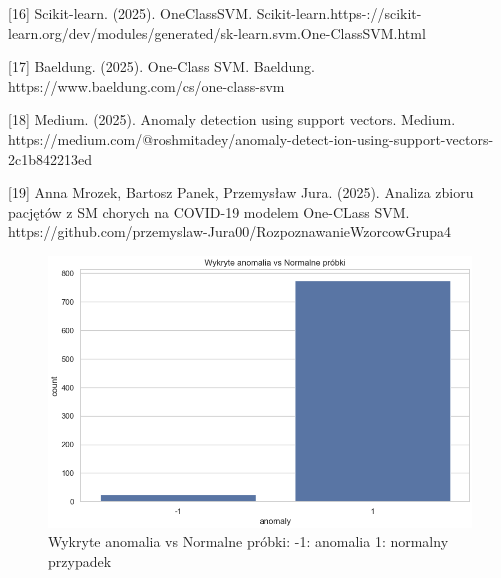 \documentclass[a4paper,fleqn]{cas-dc}
\begin{document}
[16] Scikit-learn. (2025). OneClassSVM. Scikit-learn.https-://scikit-learn.org/dev/modules/generated/sk-learn.svm.One-ClassSVM.html

[17] Baeldung. (2025). One-Class SVM. Baeldung. https://www.baeldung.com/cs/one-class-svm

[18] Medium. (2025). Anomaly detection using support vectors. Medium. https://medium.com/@roshmitadey/anomaly-detect-ion-using-support-vectors-2c1b842213ed

[19] Anna Mrozek, Bartosz Panek, Przemysław Jura. (2025). Analiza zbioru pacjętów z SM chorych na COVID-19 modelem One-CLass SVM. https://github.com/przemyslaw-Jura00/RozpoznawanieWzorcowGrupa4


\newpage
\begin{figure}[ht]
	\includegraphics[scale=.50]{wykresy/wykres1.png}
	\caption{Wykryte anomalia vs Normalne próbki: -1: anomalia 1: normalny przypadek}
	\label{FIG:1}
\end{figure}
\end{document}
